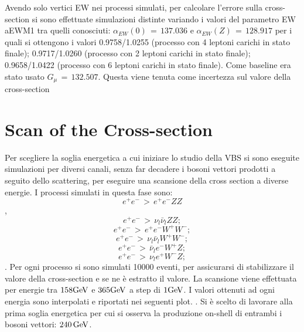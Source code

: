 Avendo solo vertici EW nei processi simulati, per calcolare l'errore sulla cross-section si sono effettuate simulazioni distinte variando i valori del parametro EW aEWM1 tra quelli conosciuti: $\alpha_{EW}(0)\,=\,137.036$ e $\alpha_{EW}(Z)\,=\,128.917$ per i quali si ottengono i valori 0.9758/1.0255 (processo con 4 leptoni carichi in stato finale); 0.9717/1.0260 (processo con 2 leptoni carichi in stato finale); 0.9658/1.0422 (processo con 6 leptoni carichi in stato finale). Come baseline era stato usato $G_\mu\,=\,132.507$. Questa viene tenuta come incertezza sul valore della cross-section 


\section{Scan of the Cross-section}
Per scegliere la soglia energetica a cui iniziare lo studio della VBS si sono eseguite simulazioni per diversi canali, senza far decadere i bosoni vettori prodotti a seguito dello scattering, per eseguire una scansione della cross section a diverse energie.
I processi simulati in questa fase sono: $$e^+e^-\,>\,e^+e^-ZZ$$, $$e^+e^-\,>\,\nu_l\bar \nu_lZZ;$$ $$e^+e^-\,>\,e^+e^-W^+W^-;$$ $$e^+e^-\,>\,\nu_l\bar \nu_lW^+W^-;$$ $$e^+e^-\,>\,\bar \nu_le^-W^+Z;$$ $$e^+e^-\,>\,\nu_le^+W^-Z;$$. Per ogni processo si sono simulati 10000 eventi, per assicurarsi di stabilizzare il valore della cross-section e se ne è estratto il valore. La scansione viene effettuata per energie tra $158\mathrm{GeV}$ e $365\mathrm{GeV}$ a step di $1\mathrm{GeV}$. I valori ottenuti ad ogni energia sono interpolati e riportati nei seguenti plot.
.
Si è scelto di lavorare alla prima soglia energetica per cui si osserva la produzione on-shell di entrambi i bosoni vettori: $240\,\mathrm{GeV}$.


